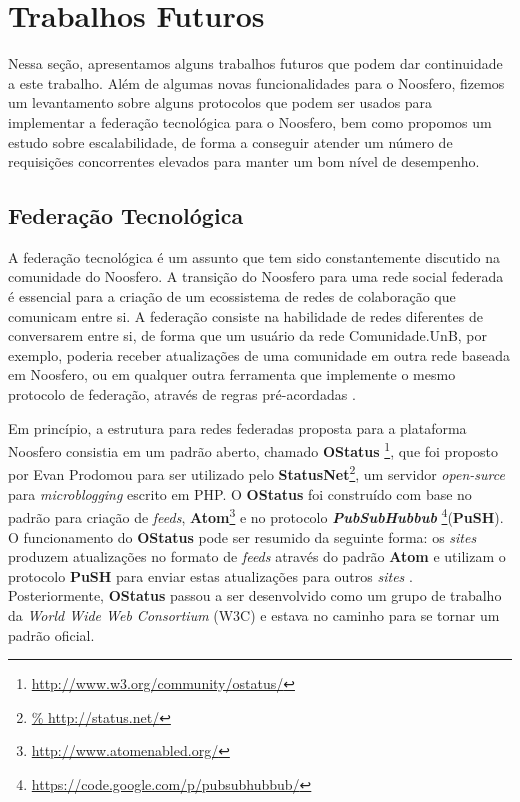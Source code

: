 \section{Trabalhos Futuros}
\label{sec:future-works}

Nessa seção, apresentamos alguns trabalhos futuros que podem dar continuidade a
este trabalho. Além de algumas novas funcionalidades para o Noosfero, fizemos
um levantamento sobre alguns protocolos que podem ser usados para implementar a
federação tecnológica para o Noosfero, bem como propomos um estudo sobre
escalabilidade, de forma a conseguir atender um número de requisições
concorrentes elevados para manter um bom nível de desempenho.

\subsection{Federação Tecnológica}

A federação tecnológica é um assunto que tem sido constantemente discutido
na comunidade do Noosfero. A transição do Noosfero para uma rede social federada
é essencial para a criação de um ecossistema de redes de colaboração que
comunicam entre si.
%
A federação consiste na habilidade de redes diferentes de conversarem entre si,
de forma que um usuário da rede Comunidade.UnB, por exemplo, poderia receber
atualizações de uma comunidade em outra rede baseada em Noosfero, ou em
qualquer outra ferramenta que implemente o mesmo protocolo de federação,
através de regras pré-acordadas \cite{prodomou2010}.

Em princípio, a estrutura para redes federadas proposta para a plataforma Noosfero
consistia em um padrão aberto, chamado \textbf{OStatus}%
\footnote{\url{http://www.w3.org/community/ostatus/}}, que foi proposto
por Evan Prodomou para ser utilizado pelo \textbf{StatusNet}\footnote{\url{%
http://status.net/}}, um servidor  \textit{open-surce} para
\textit{microblogging} escrito em PHP.
%
O \textbf{OStatus} foi construído com base no padrão para criação de \textit{feeds},
\textbf{Atom}\footnote{\url{http://www.atomenabled.org/}} e no
protocolo \textbf{\textit{PubSubHubbub}}%
\footnote{\url{https://code.google.com/p/pubsubhubbub/}}(\textbf{PuSH}).
%
O funcionamento do \textbf{OStatus} pode ser resumido da seguinte forma:
os \textit{sites} produzem atualizações no formato de \textit{feeds} através
do padrão \textbf{Atom} e utilizam o protocolo \textbf{PuSH}
para enviar estas atualizações para outros \textit{sites} \cite{OStatusBasics}.
%
Posteriormente, \textbf{OStatus} passou a ser desenvolvido como um
grupo de trabalho da \textit{World Wide Web Consortium} (W3C) e estava no
caminho para se tornar um padrão oficial.

